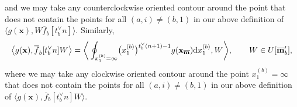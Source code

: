 \documentclass[10pt,a4paper]{amsart}
\numberwithin{equation}{section}
\begin{document}
and we may take any counterclockwise oriented contour around the point  that does not contain the points  for all $(a,i)\neq(b,1)$ in our above definition of $\big\langle g(\mathbf{x}),W\overline{f}_b[t_b^{\vee}n]\big\rangle$. Similarly,
\begin{equation*}
\big\langle g(\mathbf{x}),\overline{f}_b[t_b^{\vee}n]W\big\rangle
=\bigg\langle\oint\nolimits_{x_1^{(b)}=\infty}\bigl(x_1^{(b)}\bigr) ^{t_b^{\vee}(n+1)-1} g(\mathbf{x}_{\overline{\mathbf{m}}}){\rm d}x_1^{(b)},W\bigg\rangle, \qquad W\in U[\overline{\mathbf{m}}_b'],
\end{equation*}
where we may take any clockwise oriented contour around the point $x_1^{(b)}=\infty$ that does not contain the points  for all $(a,i)\neq(b,1)$ in our above definition of $\big\langle g(\mathbf{x}),\overline{f}_b[t_b^{\vee}n]W\big\rangle$.
\end{document}
